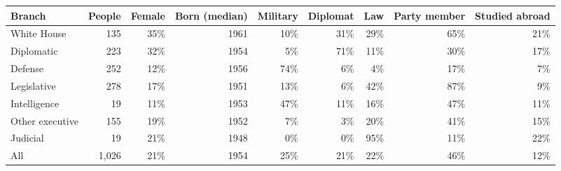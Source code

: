 \begin{tabular}{lrrrrrrrr}
\toprule
Branch & People & Female & Born (median) & Military & Diplomat & Law & Party member & Studied abroad \\
\midrule
White House & 135 & 35\% & 1961 & 10\% & 31\% & 29\% & 65\% & 21\% \\
Diplomatic & 223 & 32\% & 1954 & 5\% & 71\% & 11\% & 30\% & 17\% \\
Defense & 252 & 12\% & 1956 & 74\% & 6\% & 4\% & 17\% & 7\% \\
Legislative & 278 & 17\% & 1951 & 13\% & 6\% & 42\% & 87\% & 9\% \\
Intelligence & 19 & 11\% & 1953 & 47\% & 11\% & 16\% & 47\% & 11\% \\
Other executive & 155 & 19\% & 1952 & 7\% & 3\% & 20\% & 41\% & 15\% \\
Judicial & 19 & 21\% & 1948 & 0\% & 0\% & 95\% & 11\% & 22\% \\
All & 1,026 & 21\% & 1954 & 25\% & 21\% & 22\% & 46\% & 12\% \\
\bottomrule
\end{tabular}
